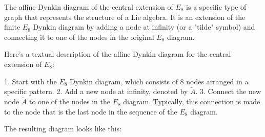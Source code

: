 The affine Dynkin diagram of the central extension of \(E_8\) is a specific type of graph that represents the structure of a Lie algebra. It is an extension of the finite \(E_8\) Dynkin diagram by adding a node at infinity (or a "tilde" symbol) and connecting it to one of the nodes in the original \(E_8\) diagram.

Here's a textual description of the affine Dynkin diagram for the central extension of \(E_8\):

1. Start with the \(E_8\) Dynkin diagram, which consists of 8 nodes arranged in a specific pattern.
2. Add a new node at infinity, denoted by \(\tilde{A}\).
3. Connect the new node \(\tilde{A}\) to one of the nodes in the \(E_8\) diagram. Typically, this connection is made to the node that is the last node in the sequence of the \(E_8\) diagram.

The resulting diagram looks like this:

